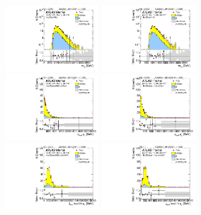 \begin{figure}[htbp!]
\begin{center}
\includegraphics[angle=270, width=0.31\textwidth]{./figures/boosted/Prereweight/Moriond_FourTag_Sideband_mHH_l_1.pdf}
\includegraphics[angle=270, width=0.31\textwidth]{./figures/boosted/Sideband/b77_FourTag_Sideband_mHH_l_1.pdf}\\
\includegraphics[angle=270, width=0.31\textwidth]{./figures/boosted/Prereweight/Moriond_FourTag_Sideband_leadHCand_Pt_m.pdf}
\includegraphics[angle=270, width=0.31\textwidth]{./figures/boosted/Sideband/b77_FourTag_Sideband_leadHCand_Pt_m.pdf}\\
\includegraphics[angle=270, width=0.31\textwidth]{./figures/boosted/Prereweight/Moriond_FourTag_Sideband_leadHCand_trk0_Pt.pdf}
\includegraphics[angle=270, width=0.31\textwidth]{./figures/boosted/Sideband/b77_FourTag_Sideband_leadHCand_trk0_Pt.pdf}\\

\end{center}
\end{figure}
